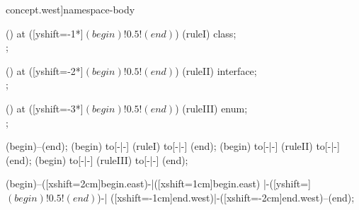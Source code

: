 \begin{syntax}[[xshift=34mm]concept.west]{namespace-body}
  
  \node[sequence] () at ([yshift=-1*\syntaxruledist]$(begin)!0.5!(end)$) {
    \node[nonterminal] (ruleI) {class};
    \\
  };
  
  \node[sequence] () at ([yshift=-2*\syntaxruledist]$(begin)!0.5!(end)$) {
    \node[nonterminal] (ruleII) {interface};
    \\
  };
  
  \node[sequence] () at ([yshift=-3*\syntaxruledist]$(begin)!0.5!(end)$) {
    \node[nonterminal] (ruleIII) {enum};
    \\
  };
  
  \draw[path] (begin)--(end);
  \draw[path] (begin) to[-|-] (ruleI) to[-|-] (end);
  \draw[path] (begin) to[-|-] (ruleII) to[-|-] (end);
  \draw[path] (begin) to[-|-] (ruleIII) to[-|-] (end);
  
  \draw[path]
    (begin)--([xshift=2cm]begin.east)-|([xshift=1cm]begin.east)
    |-([yshift=\syntaxruledist]$(begin)!0.5!(end)$)-|
    ([xshift=-1cm]end.west)|-([xshift=-2cm]end.west)--(end);
\end{syntax}
